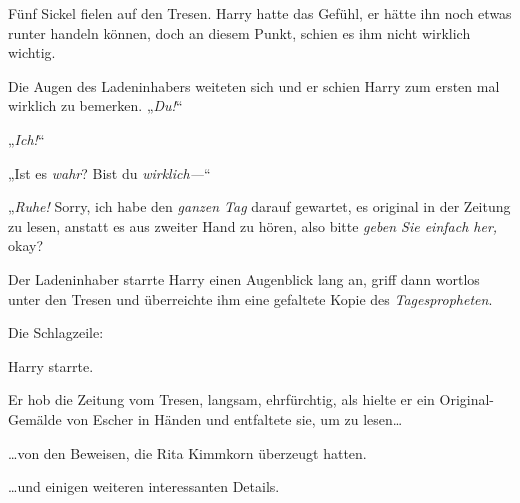 Fünf Sickel fielen auf den Tresen. Harry hatte das Gefühl, er hätte ihn noch etwas runter handeln können, doch an diesem Punkt, schien es ihm nicht wirklich wichtig.

Die Augen des Ladeninhabers weiteten sich und er schien Harry zum ersten mal wirklich zu bemerken. „\emph{Du!}“

„\emph{Ich!}“

„Ist es \emph{wahr}? Bist du \emph{wirklich—}“

„\emph{Ruhe!} Sorry, ich habe den \emph{ganzen Tag} darauf gewartet, es original in der Zeitung zu lesen, anstatt es aus zweiter Hand zu hören, also bitte \emph{geben Sie einfach her,} okay?

Der Ladeninhaber starrte Harry einen Augenblick lang an, griff dann wortlos unter den Tresen und überreichte ihm eine gefaltete Kopie des \emph{Tagespropheten}.

Die Schlagzeile:


Harry starrte.

Er hob die Zeitung vom Tresen, langsam, ehrfürchtig, als hielte er ein Original-Gemälde von Escher in Händen und entfaltete sie, um zu lesen…

…von den Beweisen, die Rita Kimmkorn überzeugt hatten.

…und einigen weiteren interessanten Details.

